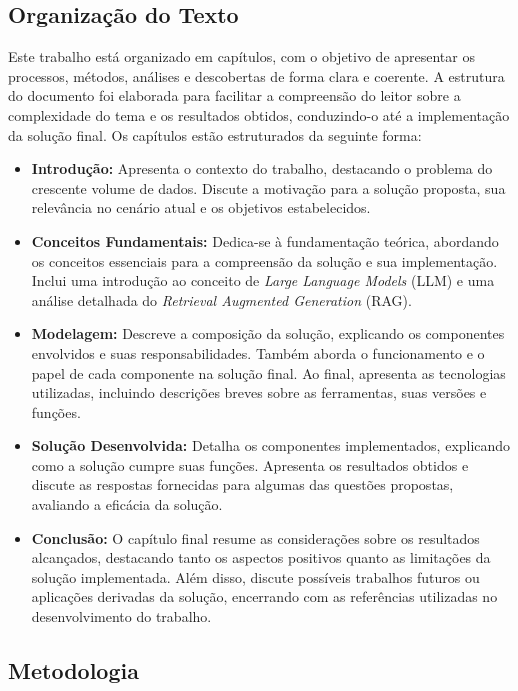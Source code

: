 \documentclass[a4paper, 12pt]{article}
\begin{document}
    \subsection{Organização do Texto}

    Este trabalho está organizado em capítulos, com o objetivo de apresentar os processos, métodos, análises e descobertas de forma clara e coerente. A estrutura do documento foi elaborada para facilitar a compreensão do leitor sobre a complexidade do tema e os resultados obtidos, conduzindo-o até a implementação da solução final. Os capítulos estão estruturados da seguinte forma:
    
    \begin{itemize}
        \item \textbf{Introdução:} Apresenta o contexto do trabalho, destacando o problema do crescente volume de dados. Discute a motivação para a solução proposta, sua relevância no cenário atual e os objetivos estabelecidos.
        \item \textbf{Conceitos Fundamentais:} Dedica-se à fundamentação teórica, abordando os conceitos essenciais para a compreensão da solução e sua implementação. Inclui uma introdução ao conceito de \textit{Large Language Models} (LLM) e uma análise detalhada do \textit{Retrieval Augmented Generation} (RAG).
        \item \textbf{Modelagem:} Descreve a composição da solução, explicando os componentes envolvidos e suas responsabilidades. Também aborda o funcionamento e o papel de cada componente na solução final. Ao final, apresenta as tecnologias utilizadas, incluindo descrições breves sobre as ferramentas, suas versões e funções.
        \item \textbf{Solução Desenvolvida:} Detalha os componentes implementados, explicando como a solução cumpre suas funções. Apresenta os resultados obtidos e discute as respostas fornecidas para algumas das questões propostas, avaliando a eficácia da solução.
        \item \textbf{Conclusão:} O capítulo final resume as considerações sobre os resultados alcançados, destacando tanto os aspectos positivos quanto as limitações da solução implementada. Além disso, discute possíveis trabalhos futuros ou aplicações derivadas da solução, encerrando com as referências utilizadas no desenvolvimento do trabalho.
    \end{itemize}

    \subsection{Metodologia}
\end{document}
